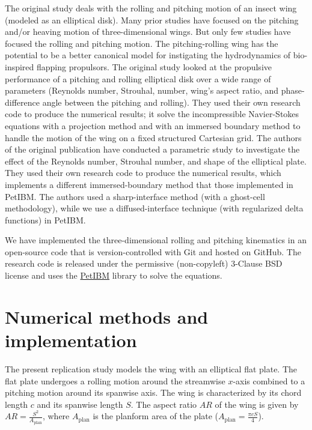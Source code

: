 The original study\supercite{li_dong_2016} deals with the rolling and pitching motion of an insect wing (modeled as an elliptical disk).
Many prior studies have focused on the pitching and/or heaving motion of three-dimensional wings.
But only few studies have focused the rolling and pitching motion.
The pitching-rolling wing has the potential to be a better canonical model for instigating the hydrodynamics of bio-inspired flapping propulsors.
The original study looked at the propulsive performance of a pitching and rolling elliptical disk over a wide range of parameters (Reynolds number, Strouhal, number, wing's aspect ratio, and phase-difference angle between the pitching and rolling).
They used their own research code to produce the numerical results; it solve the incompressible Navier-Stokes equations with a projection method and with an immersed boundary method to handle the motion of the wing on a fixed structured Cartesian grid.
The authors of the original publication have conducted a parametric study to investigate the effect of the Reynolds number, Strouhal number, and shape of the elliptical plate.
They used their own research code to produce the numerical results, which implements a different immersed-boundary method that those implemented in PetIBM.
The authors used a sharp-interface method (with a ghost-cell methodology), while we use a diffused-interface technique (with regularized delta functions) in PetIBM.

We have implemented the three-dimensional rolling and pitching kinematics in an open-source code that is version-controlled with Git and hosted on GitHub.
The research code is released under the permissive (non-copyleft) 3-Clause BSD license and uses the \href{https://github.com/barbagroup/PetIBM}{PetIBM} library\supercite{chuang_et_al_2018} to solve the equations.

\section{Numerical methods and implementation}

The present replication study models the wing with an elliptical flat plate.
The flat plate undergoes a rolling motion around the streamwise $x$-axis combined to a pitching motion around its spanwise axis.
The wing is characterized by its chord length $c$ and its spanwise length $S$.
The aspect ratio $AR$ of the wing is given by $AR = \frac{S^2}{A_\text{plan}}$, where $A_\text{plan}$ is the planform area of the plate ($A_\text{plan} = \frac{\pi c S}{4}$).

